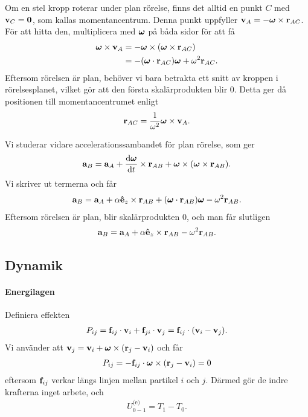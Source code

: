Om en stel kropp roterar under plan rörelse, finns det alltid en punkt $C$ med $\vb{v}_{C} = \vb{0}$, som kallas momentancentrum. Denna punkt uppfyller $\vb{v}_{A} = -\vb*{\omega}\times\vb{r}_{AC}$. För att hitta den, multiplicera med $\vb*{\omega}$ på båda sidor för att få
\begin{align*}
	\vb*{\omega}\times\vb{v}_{A} &= -\vb*{\omega}\times(\vb*{\omega}\times\vb{r}_{AC}) \\
	                             &= -(\vb*{\omega}\cdot\vb{r}_{AC})\vb*{\omega} + \omega^2\vb{r}_{AC}.
\end{align*}
Eftersom rörelsen är plan, behöver vi bara betrakta ett snitt av kroppen i rörelsesplanet, vilket gör att den första skalärprodukten blir $0$. Detta ger då positionen till momentancentrumet enligt
\begin{align*}
	\vb{r}_{AC} = \frac{1}{\omega^2}\vb*{\omega}\times\vb{v}_{A}.
\end{align*}

Vi studerar vidare accelerationssambandet för plan rörelse, som ger
\begin{align*}
	\vb{a}_{B} = \vb{a}_{A} + \dv{\vb*{\omega}}{t}\times\vb{r}_{AB} + \vb*{\omega}\times(\vb*{\omega}\times\vb{r}_{AB}).
\end{align*}
Vi skriver ut termerna och får
\begin{align*}
	\vb{a}_{B} = \vb{a}_{A} + \alpha\vu{e}_{z}\times\vb{r}_{AB} + (\vb*{\omega}\cdot\vb{r}_{AB})\vb*{\omega} - \omega^2\vb{r}_{AB}.
\end{align*}
Eftersom rörelsen är plan, blir skalärprodukten $0$, och man får slutligen
\begin{align*}
	\vb{a}_{B} = \vb{a}_{A} + \alpha\vu{e}_{z}\times\vb{r}_{AB} - \omega^2\vb{r}_{AB}.
\end{align*}

\subsection{Dynamik}

\paragraph{Energilagen}
Definiera effekten
\begin{align*}
	P_{ij} = \vb{f}_{ij}\cdot\vb{v}_{i} + \vb{f}_{ji}\cdot\vb{v}_{j} = \vb{f}_{ij}\cdot(\vb{v}_{i} - \vb{v}_{j}).
\end{align*}
Vi använder att $\vb{v}_{j} = \vb{v}_{i} + \vb*{\omega}\times(\vb{r}_{j} - \vb{v}_{i})$ och får
\begin{align*}
	P_{ij} = -\vb{f}_{ij}\cdot\vb*{\omega}\times(\vb{r}_{j} - \vb{v}_{i}) = 0
\end{align*}
eftersom $\vb{f}_{ij}$ verkar längs linjen mellan partikel $i$ och $j$. Därmed gör de indre krafterna inget arbete, och
\begin{align*}
	U_{0 - 1}^{\text{(e)}} = T_{1} - T_{0}.
\end{align*}


